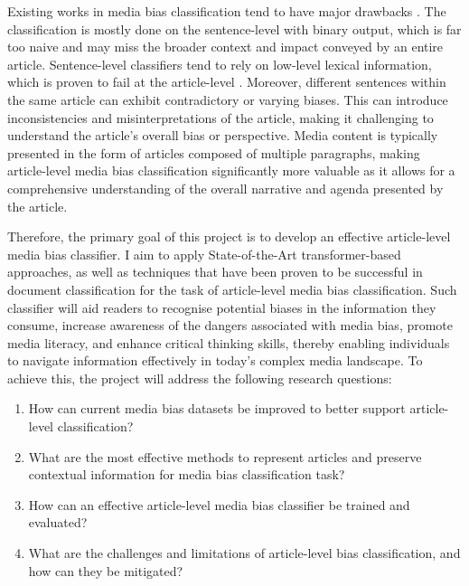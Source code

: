 Existing works in media bias classification tend to have major drawbacks \cite{maab-2023-lexical-bias-detection, maab-2023-target-aware, guo-2022-modeling, van-den-berg-2020-context,lee-2021-unifying,lei-2022-sentence,lei-2024-event-relation}.
The classification is mostly done on the sentence-level with binary output, which is far too naive and may miss the broader context and impact conveyed by an entire article. Sentence-level classifiers tend to rely on low-level lexical information, which is proven to fail at the article-level \cite{chen-2020-detecting-media-bias-gaussian}. Moreover, different sentences within the same article can exhibit contradictory or varying biases. This can introduce inconsistencies and misinterpretations of the article, making it challenging to understand the article's overall bias or perspective. Media content is typically presented in the form of articles composed of multiple paragraphs, making article-level media bias classification significantly more valuable as it allows for a comprehensive understanding of the overall narrative and agenda presented by the article.

Therefore, the primary goal of this project is to develop an effective article-level media bias classifier. I aim to apply State-of-the-Art transformer-based approaches, as well as techniques that have been proven to be successful in document classification \cite{su-2021-classifying,wan-2019-long-length,park-2022-efficient,pappagari-2019-hierarchical} for the task of article-level media bias classification. Such classifier will aid readers to recognise potential biases in the information they consume, increase awareness of the dangers associated with media bias, promote media literacy, and enhance critical thinking skills, thereby enabling individuals to navigate information effectively in today's complex media landscape. To achieve this, the project will address the following research questions:
\begin{enumerate}
    \item How can current media bias datasets be improved to better support article-level classification?
    \item What are the most effective methods to represent articles and preserve contextual information for media bias classification task?
    \item How can an effective article-level media bias classifier be trained and evaluated?
    \item What are the challenges and limitations of article-level bias classification, and how can they be mitigated?
\end{enumerate}

